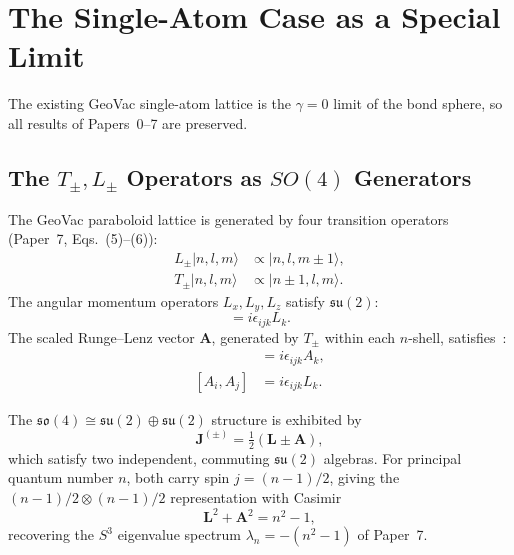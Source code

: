 \documentclass[aps,pra,twocolumn,superscriptaddress,longbibliography]{revtex4-2}
\begin{document}
\section{The Single-Atom Case as a Special Limit}
\label{sec:single_atom}

The existing GeoVac single-atom lattice is the $\gamma = 0$ limit of
the bond sphere, so all results of Papers~0--7 are preserved.

\subsection{The $T_\pm, L_\pm$ Operators as $SO(4)$ Generators}

The GeoVac paraboloid lattice is generated by four transition operators
(Paper~7, Eqs.~(5)--(6)):
\begin{align}
L_\pm |n, l, m\rangle &\propto |n, l, m \pm 1\rangle, \\
T_\pm |n, l, m\rangle &\propto |n \pm 1, l, m\rangle.
\end{align}
The angular momentum operators $L_x, L_y, L_z$ satisfy
$\mathfrak{su}(2)$:
\begin{equation}
[L_i, L_j] = i\epsilon_{ijk} L_k.
\label{eq:su2_angular}
\end{equation}
The scaled Runge--Lenz vector $\mathbf{A}$, generated by $T_\pm$
within each $n$-shell, satisfies~\cite{Bander1966}:
\begin{align}
[L_i, A_j] &= i\epsilon_{ijk} A_k, \label{eq:LA_comm} \\
[A_i, A_j] &= i\epsilon_{ijk} L_k. \label{eq:AA_comm}
\end{align}

The $\mathfrak{so}(4) \cong \mathfrak{su}(2) \oplus \mathfrak{su}(2)$
structure is exhibited by
\begin{equation}
\mathbf{J}^{(\pm)} = \tfrac{1}{2}(\mathbf{L} \pm \mathbf{A}),
\label{eq:Jpm_def}
\end{equation}
which satisfy two independent, commuting $\mathfrak{su}(2)$ algebras.
For principal quantum number $n$, both carry spin $j = (n-1)/2$,
giving the $(n-1)/2 \otimes (n-1)/2$ representation with Casimir
\begin{equation}
\mathbf{L}^2 + \mathbf{A}^2 = n^2 - 1,
\label{eq:casimir}
\end{equation}
recovering the $S^3$ eigenvalue spectrum $\lambda_n = -(n^2 - 1)$
of Paper~7.
\end{document}
